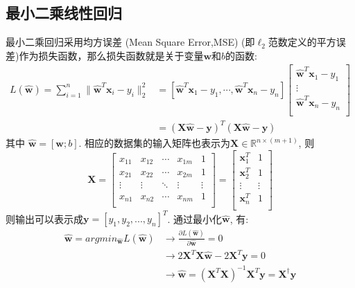 \subsection{最小二乘线性回归}
最小二乘回归采用均方误差 (Mean Square Error,MSE) (即$\ell_2$范数定义的平方误差)作为损失函数，那么损失函数就是关于变量$\boldsymbol{w}$和$b$的函数:
\begin{equation}
\begin{aligned}
L\left( \boldsymbol{\hat{w}} \right) =\sum_{i=1}^n{\lVert \boldsymbol{\hat{w}}^T\!\boldsymbol{x}_i-y_i \rVert _{2}^{2}}&=\left[ \boldsymbol{\hat{w}}^T\!\boldsymbol{x}_1-y_1,\cdots ,\boldsymbol{\hat{w}}^T\!\boldsymbol{x}_n-y_n \right] \left[ \begin{array}{c}
	\boldsymbol{\hat{w}}^T\!\boldsymbol{x}_1-y_1\\
	\vdots\\
	\boldsymbol{\hat{w}}^T\!\boldsymbol{x}_n-y_n\\
\end{array} \right] \\
&=\left( \mathbf{X}\boldsymbol{\hat{w}}-\mathbf{y} \right) ^T\left( \mathbf{X}\boldsymbol{\hat{w}}-\mathbf{y} \right)
\end{aligned}
\end{equation}
其中 $\boldsymbol{\hat{w}}= [\boldsymbol{w}; b]$. 相应的数据集的输入矩阵也表示为$\mathbf{X}\in \mathbb{R}^{n\times (m+1)}$, 则
\begin{equation}
\mathbf{X}=\left[ \begin{matrix}
	x_{11}&		x_{12}&		\cdots&		x_{1m}&		1\\
	x_{21}&		x_{22}&		\cdots&		x_{2m}&		1\\
	\vdots&		\vdots&		\ddots&		\vdots&		\vdots\\
	x_{n1}&		x_{n2}&		\cdots&		x_{nm}&		1\\
\end{matrix} \right] =\left[ \begin{matrix}
	\boldsymbol{x}_{1}^{T}&		1\\
	\boldsymbol{x}_{2}^{T}&		1\\
	\vdots&		\vdots\\
	\boldsymbol{x}_{n}^{T}&		1\\
\end{matrix} \right]  \nonumber
\end{equation}
则输出可以表示成$\mathbf{y}=[y_1,y_2,...,y_n]^T$. 通过最小化$\boldsymbol{\hat{w}}$, 有:
\begin{equation}
\begin{aligned}
\boldsymbol{\hat{w}} = argmin_{\boldsymbol{\hat{w}}}L\left( \boldsymbol{\hat{w}} \right) &\rightarrow \frac{\partial L\left( \boldsymbol{\hat{w}} \right)}{\partial \boldsymbol{\hat{w}}}=0\\
&\rightarrow 2\mathbf{X}^T\mathbf{X}\boldsymbol{\hat{w}}-2\mathbf{X}^T\mathbf{y}=0 \\
& \rightarrow \boldsymbol{\hat{w}}=\left( \mathbf{X}^T\mathbf{X} \right) ^{-1}\mathbf{X}^T\mathbf{y}=\mathbf{X}^{\dag}\mathbf{y}
\end{aligned}
\end{equation}
